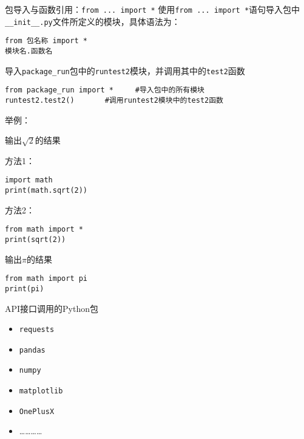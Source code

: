 \documentclass[t]{beamer}
\begin{document}
\begin{frame}[fragile]{包导入与函数引用：\texttt{from ... import *}}
使用\texttt{from ... import *}语句导入包中\verb|__init__.py|文件所定义的模块，具体语法为：
\begin{lstlisting}
from 包名称 import *
模块名.函数名
\end{lstlisting}

导入\verb|package_run|包中的\verb|runtest2|模块，并调用其中的\verb|test2|函数
\begin{lstlisting}
from package_run import *     #导入包中的所有模块
runtest2.test2()       #调用runtest2模块中的test2函数
\end{lstlisting}

\end{frame}

\begin{frame}[fragile]{举例：}
\begin{block}{输出$\sqrt{2}$的结果}
\begin{multicols*}{2}
    \centering
    方法1：
    \begin{lstlisting}
import math
print(math.sqrt(2))
\end{lstlisting}
方法2：
\begin{lstlisting}
from math import *
print(sqrt(2))
\end{lstlisting}
\end{multicols*}    
\end{block}



\begin{block}{输出$\pi$的结果}
\begin{lstlisting}
from math import pi
print(pi)      
\end{lstlisting}    
\end{block}
\end{frame}



\begin{frame}{API接口调用的Python包}
\begin{itemize}
    \item \texttt{requests}
    \item \texttt{pandas}
    \item \texttt{numpy}
    \item \texttt{matplotlib}
    \item \texttt{OnePlusX}
    \item …………
\end{itemize}
\end{frame}
\end{document}
